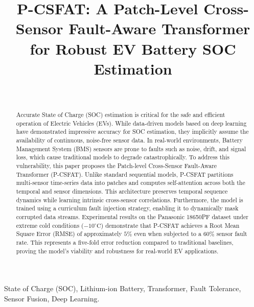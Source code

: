 \documentclass[journal]{IEEEtran}
\begin{document}
\title{P-CSFAT: A Patch-Level Cross-Sensor Fault-Aware Transformer for Robust EV Battery SOC Estimation}

\author{
     \\
}

\maketitle

\begin{abstract}
Accurate State of Charge (SOC) estimation is critical for the safe and efficient operation of Electric Vehicles (EVs). While data-driven models based on deep learning have demonstrated impressive accuracy for SOC estimation, they implicitly assume the availability of continuous, noise-free sensor data. In real-world environments, Battery Management System (BMS) sensors are prone to faults such as noise, drift, and signal loss, which cause traditional models to degrade catastrophically. To address this vulnerability, this paper proposes the Patch-level Cross-Sensor Fault-Aware Transformer (P-CSFAT). Unlike standard sequential models, P-CSFAT partitions multi-sensor time-series data into patches and computes self-attention across both the temporal and sensor dimensions. This architecture preserves temporal sequence dynamics while learning intrinsic cross-sensor correlations. Furthermore, the model is trained using a curriculum fault injection strategy, enabling it to dynamically mask corrupted data streams. Experimental results on the Panasonic 18650PF dataset under extreme cold conditions ($-10^\circ\text{C}$) demonstrate that P-CSFAT achieves a Root Mean Square Error (RMSE) of approximately $5\%$ even when subjected to a $60\%$ sensor fault rate. This represents a five-fold error reduction compared to traditional baselines, proving the model's viability and robustness for real-world EV applications.
\end{abstract}

\begin{IEEEkeywords}
State of Charge (SOC), Lithium-ion Battery, Transformer, Fault Tolerance, Sensor Fusion, Deep Learning.
\end{IEEEkeywords}
\end{document}
